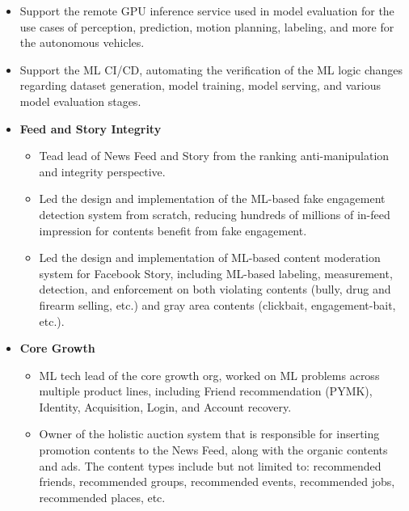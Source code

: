 \documentclass[11pt,a4paper,sans]{moderncv}
\begin{document}
{
  \begin{itemize} %
    \item Support the remote GPU inference service used in model evaluation for the use cases of perception, prediction, motion planning, labeling, and more for the autonomous vehicles.
    \item Support the ML CI/CD, automating the verification of the ML logic changes regarding dataset generation, model training, model serving, and various model evaluation stages.
  \end{itemize}
}

{
\begin{itemize} %
	\item \textbf{Feed and Story Integrity}
  \begin{itemize} %
    \item Tead lead of News Feed and Story from the ranking anti-manipulation and integrity perspective. 
    \item Led the design and implementation of the ML-based fake engagement detection system from scratch, reducing hundreds of millions of in-feed impression for contents benefit from fake engagement.
    \item Led the design and implementation of ML-based content moderation system for Facebook Story, including ML-based labeling, measurement, detection, and enforcement on both violating contents (bully, drug and firearm selling, etc.) and gray area contents (clickbait, engagement-bait, etc.).
  \end{itemize}
\item \textbf{Core Growth }
  \begin{itemize} %
      \item ML tech lead of the core growth org, worked on ML problems across multiple product lines, including Friend recommendation (PYMK), Identity, Acquisition, Login, and Account recovery.
      \item Owner of the holistic auction system that is responsible for inserting promotion contents to the News Feed, along with the organic contents and ads. The content types include but not limited to: recommended friends, recommended groups, recommended events, recommended jobs, recommended places, etc.

\end{itemize}
\end{itemize}}
\end{document}
